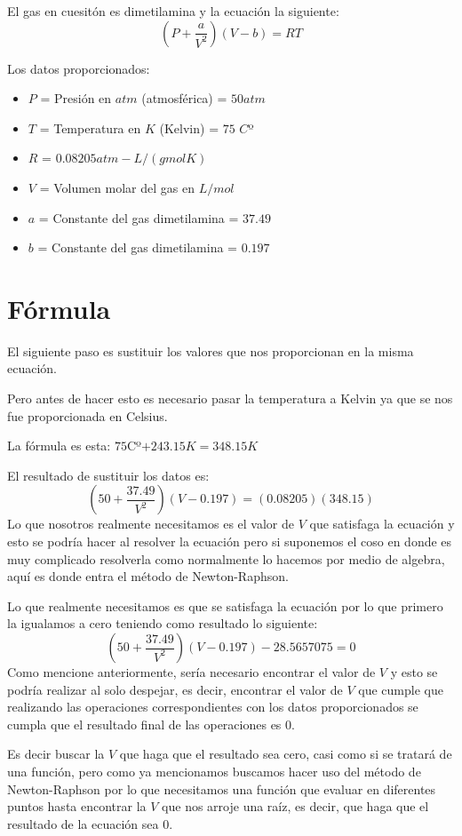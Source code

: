 \documentclass{article}
\begin{document}
El gas en cuesitón es dimetilamina y la ecuación la siguiente:
$$ (P+\frac{a}{V^2})(V-b)=RT $$

Los datos proporcionados:
\begin{itemize}
    \item $P$ = Presión en $atm$ (atmosférica) = $50 atm$
    \item $T$ = Temperatura en $K$ (Kelvin) = $75$ $C$º
    \item $R$ = $0.08205 atm-L/(gmolK)$
    \item $V$ = Volumen molar del gas en $L/mol$
    \item $a$ = Constante del gas dimetilamina = $37.49$
    \item $b$ = Constante del gas dimetilamina = $0.197$
\end{itemize}

\section{Fórmula}
El siguiente paso es sustituir los valores que nos proporcionan en la misma ecuación.

Pero antes de hacer esto es necesario pasar la temperatura a Kelvin ya que se nos fue proporcionada en Celsius.

La fórmula es esta: $75$Cº$+243.15K= 348.15K$


El resultado de sustituir los datos es:
$$ (50+\frac{37.49}{V^2})(V-0.197)=(0.08205)(348.15) $$
Lo que nosotros realmente necesitamos es el valor de $V$ que satisfaga la ecuación y esto se podría hacer al resolver la ecuación pero si suponemos el coso en donde es muy complicado resolverla como normalmente lo hacemos por medio de algebra, aquí es donde entra el método de Newton-Raphson.

Lo que realmente necesitamos es que se satisfaga la ecuación por lo que primero la igualamos a cero teniendo como resultado lo siguiente:
$$ (50+\frac{37.49}{V^2})(V-0.197)-28.5657075=0$$
Como mencione anteriormente, sería necesario encontrar el valor de $V$ y esto se podría realizar al solo despejar, es decir, encontrar el valor de $V$ que cumple que realizando las operaciones correspondientes con los datos proporcionados se cumpla que el resultado final de las operaciones es 0.

Es decir buscar la $V$ que haga que el resultado sea cero, casi como si se tratará de una función, pero como ya mencionamos buscamos hacer uso del método de Newton-Raphson por lo que necesitamos una función que evaluar en diferentes puntos hasta encontrar la $V$ que nos arroje una raíz, es decir, que haga que el resultado de la ecuación sea 0.
\end{document}
